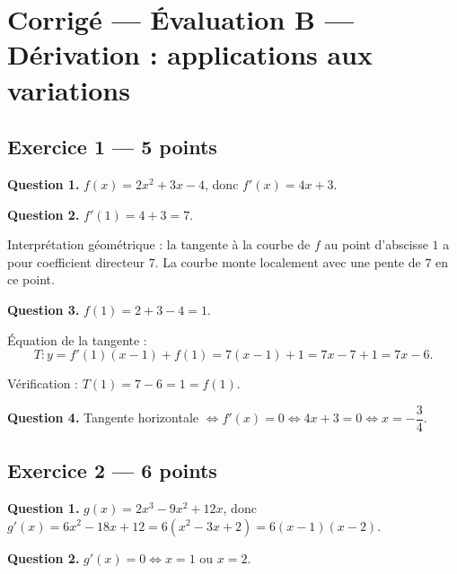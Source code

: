 
\section*{Corrigé — Évaluation B — Dérivation : applications aux variations}

\subsection*{Exercice 1 — 5 points}


\textbf{Question 1.}
$f(x) = 2x^2 + 3x - 4$, donc $f'(x) = 4x + 3.$

\textbf{Question 2.}
$f'(1) = 4 + 3 = 7.$

Interprétation géométrique : la tangente à la courbe de $f$ au point d'abscisse $1$ a pour coefficient directeur $7$. La courbe monte localement avec une pente de $7$ en ce point.

\textbf{Question 3.}
$f(1) = 2 + 3 - 4 = 1.$

Équation de la tangente :
\[
T : y = f'(1)(x - 1) + f(1) = 7(x-1) + 1 = 7x - 7 + 1 = 7x - 6.
\]

Vérification : $T(1) = 7 - 6 = 1 = f(1)$. \checkmark

\textbf{Question 4.}
Tangente horizontale $\Leftrightarrow f'(x) = 0 \Leftrightarrow 4x + 3 = 0 \Leftrightarrow x = -\dfrac{3}{4}.$

\subsection*{Exercice 2 — 6 points}


\textbf{Question 1.}
$g(x) = 2x^3 - 9x^2 + 12x$, donc $g'(x) = 6x^2 - 18x + 12 = 6(x^2 - 3x + 2) = 6(x-1)(x-2).$

\textbf{Question 2.}
$g'(x) = 0 \Leftrightarrow x = 1$ ou $x = 2.$


